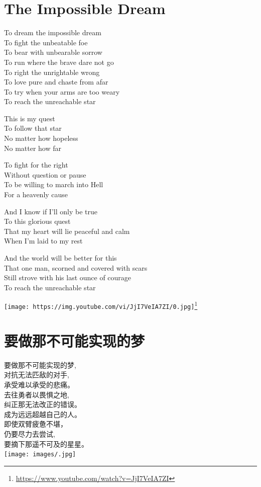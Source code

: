 \documentclass[]{book}
\renewenvironment{quote}{\begin{VF}}{\end{VF}}
\renewcommand{\href}[2]{#2\footnote{\url{#1}}}
\begin{document}
\section{The Impossible Dream}\label{the-impossible-dream}

\begin{quote}
To dream the impossible dream\\
To fight the unbeatable foe\\
To bear with unbearable sorrow\\
To run where the brave dare not go\\
To right the unrightable wrong\\
To love pure and chaste from afar\\
To try when your arms are too weary\\
To reach the unreachable star

This is my quest\\
To follow that star\\
No matter how hopeless\\
No matter how far

To fight for the right\\
Without question or pause\\
To be willing to march into Hell\\
For a heavenly cause

And I know if I'll only be true\\
To this glorious quest\\
That my heart will lie peaceful and calm\\
When I'm laid to my rest

And the world will be better for this\\
That one man, scorned and covered with scars\\
Still strove with his last ounce of courage\\
To reach the unreachable star
\end{quote}

\href{https://www.youtube.com/watch?v=JjI7VeIA7ZI}{\texttt{[image: https://img.youtube.com/vi/JjI7VeIA7ZI/0.jpg]}}

\section{要做那不可能实现的梦}

\begin{quote}
要做那不可能实现的梦,\\
对抗无法匹敌的对手,\\
承受难以承受的悲痛。\\
去往勇者以畏惧之地,\\
纠正那无法改正的错误。\\
成为远远超越自己的人。\\
即使双臂疲惫不堪，\\
仍要尽力去尝试,\\
要摘下那遥不可及的星星。\\
\texttt{[image: images/.jpg]}
\end{quote}
\end{document}
